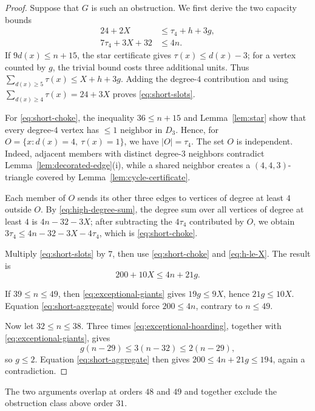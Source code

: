 \documentclass[11pt]{article}
\numberwithin{equation}{section}
\theoremstyle{definition}
\theoremstyle{remark}
\begin{document}
\begin{proof}
Suppose that \(G\) is such an obstruction.  We first derive the two capacity
bounds
\begin{align}
  24+2X&\le\tau_4+h+3g,              \label{eq:short-slots}\\
  7\tau_4+3X+32&\le4n.               \label{eq:short-choke}
\end{align}
If \(9d(x)\le n+15\), the star certificate gives
\(\tau(x)\le d(x)-3\); for a vertex counted by \(g\), the trivial bound
costs three additional units.  Thus
\(\sum_{d(x)\ge5}\tau(x)\le X+h+3g\).  Adding the degree-\(4\) contribution
and using \(\sum_{d(x)\ge4}\tau(x)=24+3X\) proves
\eqref{eq:short-slots}.

For \eqref{eq:short-choke}, the inequality \(36\le n+15\) and
Lemma~\ref{lem:star} show that every degree-\(4\) vertex has \(\le1\)
neighbor in \(D_3\).  Hence, for
\(O=\{x:d(x)=4,\ \tau(x)=1\}\), we have \(|O|=\tau_4\).
The set \(O\) is independent.  Indeed, adjacent members with distinct
degree-\(3\) neighbors contradict Lemma~\ref{lem:decorated-edge}(i), while
a shared neighbor creates a \((4,4,3)\)-triangle covered by
Lemma~\ref{lem:cycle-certificate}.

Each member of \(O\) sends its other three edges to vertices of degree
at least \(4\) outside \(O\).  By \eqref{eq:high-degree-sum}, the degree sum
over all vertices of degree at least \(4\) is \(4n-32-3X\); after subtracting
the \(4\tau_4\) contributed by \(O\), we obtain
\(3\tau_4\le4n-32-3X-4\tau_4\), which is \eqref{eq:short-choke}.

Multiply \eqref{eq:short-slots} by \(7\), then use
\eqref{eq:short-choke} and \eqref{eq:h-le-X}.  The result is
\begin{equation}\label{eq:short-aggregate}
  200+10X\le4n+21g.
\end{equation}

If \(39\le n\le49\), then \eqref{eq:exceptional-giants} gives
\(19g\le9X\), hence \(21g\le10X\).  Equation
\eqref{eq:short-aggregate} would force \(200\le4n\), contrary to
\(n\le49\).

Now let \(32\le n\le38\).  Three times
\eqref{eq:exceptional-hoarding}, together with
\eqref{eq:exceptional-giants}, gives
\[
 g(n-29)\le3(n-32)\le2(n-29),
\]
so \(g\le2\).  Equation \eqref{eq:short-aggregate} then gives
\(200\le4n+21g\le194\), again a contradiction.
\end{proof}

The two arguments overlap at orders \(48\) and \(49\) and together exclude
the obstruction class above order \(31\).
\end{document}
